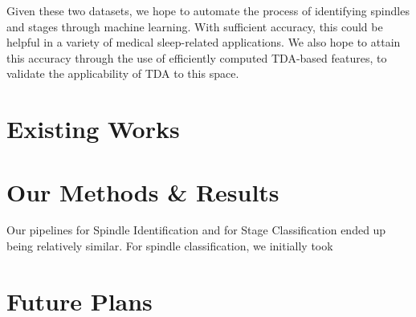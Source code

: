 \documentclass[11pt]{article}
\begin{document}
Given these two datasets, we hope to automate the process of identifying spindles and stages through machine learning. With sufficient accuracy, this could be helpful in a variety of medical sleep-related applications. We also hope to attain this accuracy through the use of efficiently computed TDA-based features, to validate the applicability of TDA to this space.

\section{Existing Works}

\section{Our Methods \& Results}

Our pipelines for Spindle Identification and for Stage Classification ended up being relatively similar. For spindle classification, we initially took 

\section{Future Plans}

 

\end{document}
